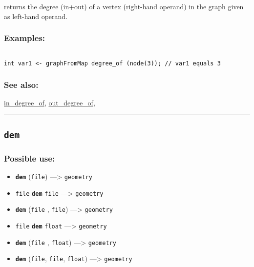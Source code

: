 \documentclass[]{book}
\providecommand{\tightlist}{%
  \setlength{\itemsep}{0pt}\setlength{\parskip}{0pt}}
\theoremstyle{definition}
\theoremstyle{definition}
\theoremstyle{definition}
\theoremstyle{remark}
\begin{document}
returns the degree (in+out) of a vertex (right-hand operand) in the
graph given as left-hand operand.

\subsubsection{Examples:}\label{examples-97}

\begin{verbatim}
 
int var1 <- graphFromMap degree_of (node(3)); // var1 equals 3
\end{verbatim}

\subsubsection{See also:}\label{see-also-76}

\href{OperatorsIM\#in_degree_of}{in\_degree\_of},
\href{OperatorsNR\#out_degree_of}{out\_degree\_of},

\begin{center}\rule{0.5\linewidth}{\linethickness}\end{center}

\subsection{\texorpdfstring{\texttt{dem}}{dem}}\label{dem}

\subsubsection{Possible use:}\label{possible-use-128}

\begin{itemize}
\tightlist
\item
  \textbf{\texttt{dem}} (\texttt{file}) ---\textgreater{}
  \texttt{geometry}
\item
  \texttt{file} \textbf{\texttt{dem}} \texttt{file} ---\textgreater{}
  \texttt{geometry}
\item
  \textbf{\texttt{dem}} (\texttt{file} , \texttt{file})
  ---\textgreater{} \texttt{geometry}
\item
  \texttt{file} \textbf{\texttt{dem}} \texttt{float} ---\textgreater{}
  \texttt{geometry}
\item
  \textbf{\texttt{dem}} (\texttt{file} , \texttt{float})
  ---\textgreater{} \texttt{geometry}
\item
  \textbf{\texttt{dem}} (\texttt{file}, \texttt{file}, \texttt{float})
  ---\textgreater{} \texttt{geometry}
\end{itemize}
\end{document}
